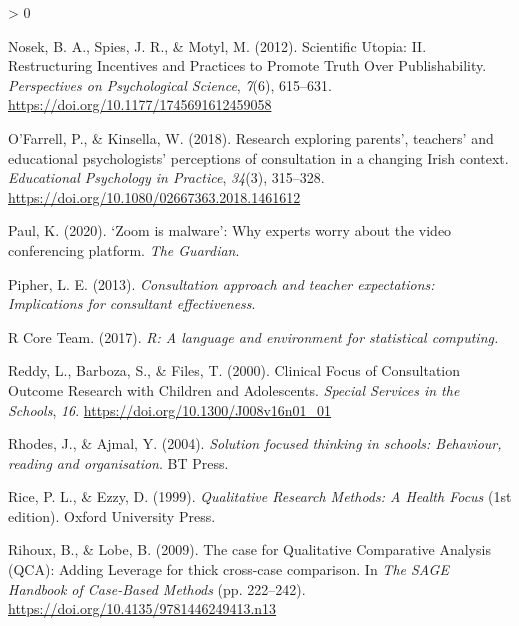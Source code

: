 \documentclass[
  english,
  man]{apa}
\newlength{\cslhangindent}
\newenvironment{CSLReferences}[2] %
 {%
  \setlength{\parindent}{0pt}
  \ifodd #1 \everypar{\setlength{\hangindent}{\cslhangindent}}\ignorespaces\fi
  \ifnum #2 > 0
  \setlength{\parskip}{#2\baselineskip}
  \fi
 }%
 {}
\begin{document}
\begin{CSLReferences}{1}{0}
\leavevmode\hypertarget{ref-nosekScientificUtopiaII2012a}{}%
Nosek, B. A., Spies, J. R., \& Motyl, M. (2012). Scientific {Utopia}: {II}. {Restructuring Incentives} and {Practices} to {Promote Truth Over Publishability}. \emph{Perspectives on Psychological Science}, \emph{7}(6), 615--631. \url{https://doi.org/10.1177/1745691612459058}

\leavevmode\hypertarget{ref-ofarrellResearchExploringParents2018}{}%
O'Farrell, P., \& Kinsella, W. (2018). Research exploring parents', teachers' and educational psychologists' perceptions of consultation in a changing {Irish} context. \emph{Educational Psychology in Practice}, \emph{34}(3), 315--328. \url{https://doi.org/10.1080/02667363.2018.1461612}

\leavevmode\hypertarget{ref-paulZoomMalwareWhy2020}{}%
Paul, K. (2020). {`{Zoom} is malware'}: Why experts worry about the video conferencing platform. \emph{The Guardian}.

\leavevmode\hypertarget{ref-pipherConsultationApproachTeacher2013a}{}%
Pipher, L. E. (2013). \emph{Consultation approach and teacher expectations: {Implications} for consultant effectiveness}.

\leavevmode\hypertarget{ref-rcoreteamLanguageEnvironmentStatistical2017}{}%
R Core Team. (2017). \emph{R: {A} language and environment for statistical computing.}

\leavevmode\hypertarget{ref-reddyClinicalFocusConsultation2000}{}%
Reddy, L., Barboza, S., \& Files, T. (2000). Clinical {Focus} of {Consultation Outcome Research} with {Children} and {Adolescents}. \emph{Special Services in the Schools}, \emph{16}. \url{https://doi.org/10.1300/J008v16n01_01}

\leavevmode\hypertarget{ref-rhodesSolutionFocusedThinking2004a}{}%
Rhodes, J., \& Ajmal, Y. (2004). \emph{Solution focused thinking in schools: Behaviour, reading and organisation}. {BT Press}.

\leavevmode\hypertarget{ref-riceQualitativeResearchMethods1999}{}%
Rice, P. L., \& Ezzy, D. (1999). \emph{Qualitative {Research Methods}: {A Health Focus}} (1st edition). {Oxford University Press}.

\leavevmode\hypertarget{ref-rihouxCaseQualitativeComparative2009}{}%
Rihoux, B., \& Lobe, B. (2009). The case for {Qualitative Comparative Analysis} ({QCA}): {Adding Leverage} for thick cross-case comparison. In \emph{The {SAGE Handbook} of {Case}-{Based Methods}} (pp. 222--242). \url{https://doi.org/10.4135/9781446249413.n13}


\end{CSLReferences}
\end{document}
